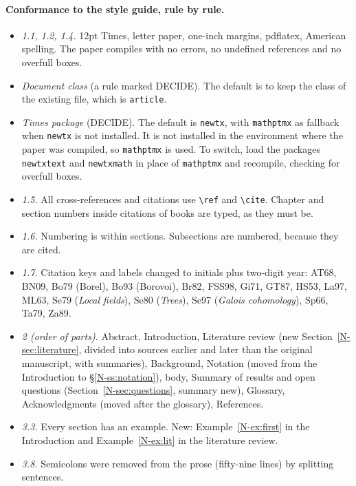 \documentclass[12pt,letterpaper]{article}
\begin{document}
\paragraph{Conformance to the style guide, rule by rule.}
\begin{itemize}[itemsep=1pt]
\item \emph{1.1, 1.2, 1.4.} 12pt Times, letter paper, one-inch margins,
  pdflatex, American spelling. The paper compiles with no errors, no
  undefined references and no overfull boxes.
\item \emph{Document class} (a rule marked DECIDE). The default is to
  keep the class of the existing file, which is \texttt{article}.
\item \emph{Times package} (DECIDE). The default is \texttt{newtx}, with
  \texttt{mathptmx} as fallback when \texttt{newtx} is not installed. It
  is not installed in the environment where the paper was compiled, so
  \texttt{mathptmx} is used. To switch, load the packages
  \texttt{newtxtext} and \texttt{newtxmath} in place of
  \texttt{mathptmx} and recompile, checking for overfull boxes.
\item \emph{1.5.} All cross-references and citations use \verb|\ref| and
  \verb|\cite|. Chapter and section numbers inside citations of books are
  typed, as they must be.
\item \emph{1.6.} Numbering is within sections. Subsections are numbered,
  because they are cited.
\item \emph{1.7.} Citation keys and labels changed to initials plus
  two-digit year: AT68, BN09, Bo79 (Borel), Bo93 (Borovoi), Br82, FSS98,
  Gi71, GT87, HS53, La97, ML63, Se79 (\emph{Local fields}), Se80
  (\emph{Trees}), Se97 (\emph{Galois cohomology}), Sp66, Ta79, Za89.
\item \emph{2 (order of parts).} Abstract, Introduction, Literature
  review (new Section~\ref{N-sec:literature}, divided into sources
  earlier and later than the original manuscript, with summaries),
  Background, Notation (moved from the Introduction to
  \S\ref{N-ss:notation}), body, Summary of results and open questions
  (Section~\ref{N-sec:questions}, summary new), Glossary, Acknowledgments
  (moved after the glossary), References.
\item \emph{3.3.} Every section has an example. New:
  Example~\ref{N-ex:first} in the Introduction and
  Example~\ref{N-ex:lit} in the literature review.
\item \emph{3.8.} Semicolons were removed from the prose (fifty-nine
  lines) by splitting sentences.

\end{itemize}
\end{document}
